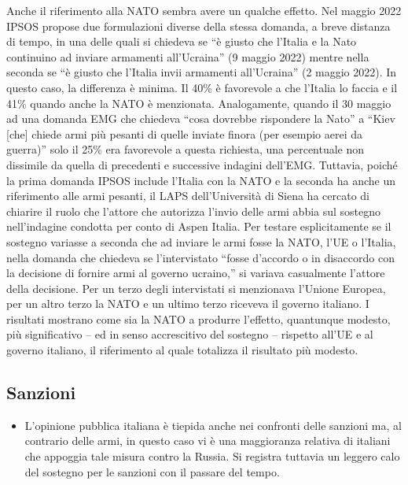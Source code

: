 \documentclass[
  openany]{book}
\providecommand{\tightlist}{%
  \setlength{\itemsep}{0pt}\setlength{\parskip}{0pt}}
\begin{document}
Anche il riferimento alla NATO sembra avere un qualche effetto. Nel maggio 2022 IPSOS propose due formulazioni diverse della stessa domanda, a breve distanza di tempo, in una delle quali si chiedeva se ``è giusto che l'Italia e la Nato continuino ad inviare armamenti all'Ucraina'' (9 maggio 2022) mentre nella seconda se ``è giusto che l'Italia invii armamenti all'Ucraina'' (2 maggio 2022). In questo caso, la differenza è minima. Il 40\% è favorevole a che l'Italia lo faccia e il 41\% quando anche la NATO è menzionata. Analogamente, quando il 30 maggio ad una domanda EMG che chiedeva ``cosa dovrebbe rispondere la Nato'' a ``Kiev {[}che{]} chiede armi più pesanti di quelle inviate finora (per esempio aerei da guerra)'' solo il 25\% era favorevole a questa richiesta, una percentuale non dissimile da quella di precedenti e successive indagini dell'EMG. Tuttavia, poiché la prima domanda IPSOS include l'Italia con la NATO e la seconda ha anche un riferimento alle armi pesanti, il LAPS dell'Università di Siena ha cercato di chiarire il ruolo che l'attore che autorizza l'invio delle armi abbia sul sostegno nell'indagine condotta per conto di Aspen Italia. Per testare esplicitamente se il sostegno variasse a seconda che ad inviare le armi fosse la NATO, l'UE o l'Italia, nella domanda che chiedeva se l'intervistato ``fosse d'accordo o in disaccordo con la decisione di fornire armi al governo ucraino,'' si variava casualmente l'attore della decisione. Per un terzo degli intervistati si menzionava l'Unione Europea, per un altro terzo la NATO e un ultimo terzo riceveva il governo italiano. I risultati mostrano come sia la NATO a produrre l'effetto, quantunque modesto, più significativo -- ed in senso accrescitivo del sostegno -- rispetto all'UE e al governo italiano, il riferimento al quale totalizza il risultato più modesto.

\hypertarget{sanzioni}{%
\subsection{Sanzioni}\label{sanzioni}}

\begin{itemize}
\tightlist
\item
  L'opinione pubblica italiana è tiepida anche nei confronti delle sanzioni ma, al contrario delle armi, in questo caso vi è una maggioranza relativa di italiani che appoggia tale misura contro la Russia. Si registra tuttavia un leggero calo del sostegno per le sanzioni con il passare del tempo.
\end{itemize}
\end{document}
